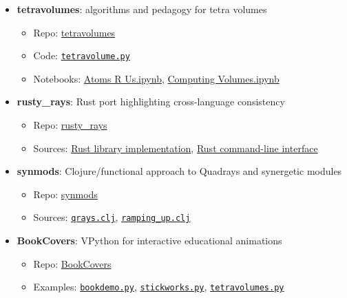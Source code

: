 \documentclass[
  10pt,
]{article}
\providecommand{\tightlist}{%
  \setlength{\itemsep}{0pt}\setlength{\parskip}{0pt}}
\begin{document}
\begin{itemize}
\tightlist
\item
  \textbf{tetravolumes}: algorithms and pedagogy for tetra volumes

  \begin{itemize}
  \tightlist
  \item
    Repo:
    \href{https://github.com/4dsolutions/tetravolumes}{tetravolumes}
  \item
    Code:
    \href{https://github.com/4dsolutions/tetravolumes/blob/master/tetravolume.py}{\texttt{tetravolume.py}}
  \item
    Notebooks:
    \href{https://raw.githubusercontent.com/4dsolutions/tetravolumes/refs/heads/master/Atoms\%20R\%20Us.ipynb}{Atoms
    R Us.ipynb},
    \href{https://raw.githubusercontent.com/4dsolutions/tetravolumes/refs/heads/master/Computing\%20Volumes.ipynb}{Computing
    Volumes.ipynb}
  \end{itemize}
\item
  \textbf{rusty\_rays}: Rust port highlighting cross-language
  consistency

  \begin{itemize}
  \tightlist
  \item
    Repo: \href{https://github.com/4dsolutions/rusty_rays}{rusty\_rays}
  \item
    Sources:
    \href{https://github.com/4dsolutions/rusty_rays/blob/master/src/lib.rs}{Rust
    library implementation},
    \href{https://github.com/4dsolutions/rusty_rays/blob/master/src/main.rs}{Rust
    command-line interface}
  \end{itemize}
\item
  \textbf{synmods}: Clojure/functional approach to Quadrays and
  synergetic modules

  \begin{itemize}
  \tightlist
  \item
    Repo: \href{https://github.com/4dsolutions/synmods}{synmods}
  \item
    Sources:
    \href{https://github.com/4dsolutions/synmods/blob/master/qrays.clj}{\texttt{qrays.clj}},
    \href{https://github.com/4dsolutions/synmods/blob/master/ramping_up.clj}{\texttt{ramping\_up.clj}}
  \end{itemize}
\item
  \textbf{BookCovers}: VPython for interactive educational animations

  \begin{itemize}
  \tightlist
  \item
    Repo: \href{https://github.com/4dsolutions/BookCovers}{BookCovers}
  \item
    Examples:
    \href{https://github.com/4dsolutions/BookCovers/blob/master/bookdemo.py}{\texttt{bookdemo.py}},
    \href{https://github.com/4dsolutions/BookCovers/blob/master/stickworks.py}{\texttt{stickworks.py}},
    \href{https://github.com/4dsolutions/BookCovers/blob/master/tetravolumes.py}{\texttt{tetravolumes.py}}
  \end{itemize}
\end{itemize}
\end{document}
